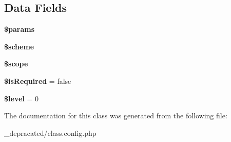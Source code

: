 \subsection*{\-Data \-Fields}
\begin{DoxyCompactItemize}
\item 
\hypertarget{class_bracket_config_afe68e6fbe7acfbffc0af0c84a1996466}{
{\bfseries \$params}}
\label{class_bracket_config_afe68e6fbe7acfbffc0af0c84a1996466}

\item 
\hypertarget{class_bracket_config_a1665950e3e3b63a02fc5a48706ac81c4}{
{\bfseries \$scheme}}
\label{class_bracket_config_a1665950e3e3b63a02fc5a48706ac81c4}

\item 
\hypertarget{class_bracket_config_a2be0196776237c03bf3f5867c44317fc}{
{\bfseries \$scope}}
\label{class_bracket_config_a2be0196776237c03bf3f5867c44317fc}

\item 
\hypertarget{class_bracket_config_a082cf27a763fbe0037f3c586ac644940}{
{\bfseries \$is\-Required} = false}
\label{class_bracket_config_a082cf27a763fbe0037f3c586ac644940}

\item 
\hypertarget{class_bracket_config_abd32cc82c6a3f79491987de36ad580ca}{
{\bfseries \$level} = 0}
\label{class_bracket_config_abd32cc82c6a3f79491987de36ad580ca}

\end{DoxyCompactItemize}


\-The documentation for this class was generated from the following file\-:\begin{DoxyCompactItemize}
\item 
\-\_\-depracated/class.\-config.\-php\end{DoxyCompactItemize}
